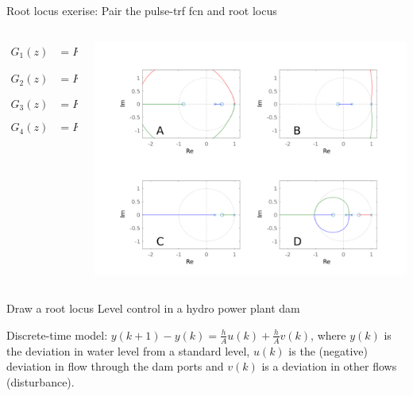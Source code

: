 \documentclass[presentation,aspectratio=169]{beamer}
\begin{document}
\begin{frame}[label=sec-3-6]{Root locus exerise: Pair the pulse-trf fcn and root locus}
\begin{columns}
\begin{column}{0.35\textwidth}

 \small
\begin{align*}
  G_1(z) &= K\frac{(z+2.9)(z+0.2)}{(z-1)^2(z-0.3)}\\[3mm]
  G_2(z) &= K\frac{(z-0.5)(z+0.4)}{(z-1)(z-0.3)(z-0.1)}\\[3mm]
  G_3(z) &= K\frac{(z-0.5)(z+0.8)}{(z-1)^2(z-0.3)}\\[3mm]
  G_4(z) &= K \frac{z-0.6}{(z-1)(z-0.3)}
\end{align*}
\end{column}

\begin{column}{0.65\textwidth}
\begin{center}
\includegraphics[width=1.04\linewidth]{../../matlab/rlocus_2x2-crop}
\end{center}
\end{column}
\end{columns}
\end{frame}


\begin{frame}[label=sec-3-7]{Draw a root locus}
Level control in a hydro power plant dam

\begin{center}
\small
\def\svgwidth{0.5\linewidth}

\end{center}

Discrete-time model: \(y(k+1) - y(k) = \frac{h}{A} u(k) + \frac{h}{A}v(k)\), where \(y(k)\) is the deviation in water level from a standard level, \(u(k)\) is the (negative) deviation in flow through the dam ports and \(v(k)\) is a deviation in other flows (disturbance). 
\end{frame}
\end{document}

